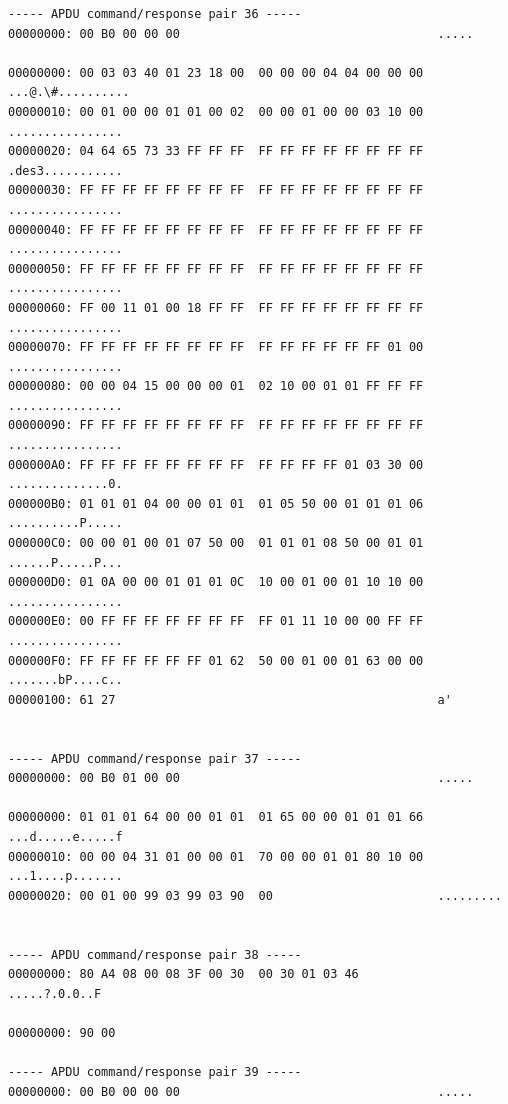 \documentclass[bsc,frontabs,twoside,singlespacing,parskip,deptreport]{infthesis}     %
\begin{document}
\begin{appendices}
\begin{Verbatim}[commandchars=\\\{\}, fontsize=\small]
----- APDU command/response pair 36 -----
00000000: 00 B0 00 00 00                                    .....

00000000: 00 03 03 40 01 23 18 00  00 00 00 04 04 00 00 00  ...@.\#..........
00000010: 00 01 00 00 01 01 00 02  00 00 01 00 00 03 10 00  ................
00000020: 04 64 65 73 33 FF FF FF  FF FF FF FF FF FF FF FF  .des3...........
00000030: FF FF FF FF FF FF FF FF  FF FF FF FF FF FF FF FF  ................
00000040: FF FF FF FF FF FF FF FF  FF FF FF FF FF FF FF FF  ................
00000050: FF FF FF FF FF FF FF FF  FF FF FF FF FF FF FF FF  ................
00000060: FF 00 11 01 00 18 FF FF  FF FF FF FF FF FF FF FF  ................
00000070: FF FF FF FF FF FF FF FF  FF FF FF FF FF FF 01 00  ................
00000080: 00 00 04 15 00 00 00 01  02 10 00 01 01 FF FF FF  ................
00000090: FF FF FF FF FF FF FF FF  FF FF FF FF FF FF FF FF  ................
000000A0: FF FF FF FF FF FF FF FF  FF FF FF FF 01 03 30 00  ..............0.
000000B0: 01 01 01 04 00 00 01 01  01 05 50 00 01 01 01 06  ..........P.....
000000C0: 00 00 01 00 01 07 50 00  01 01 01 08 50 00 01 01  ......P.....P...
000000D0: 01 0A 00 00 01 01 01 0C  10 00 01 00 01 10 10 00  ................
000000E0: 00 FF FF FF FF FF FF FF  FF 01 11 10 00 00 FF FF  ................
000000F0: FF FF FF FF FF FF 01 62  50 00 01 00 01 63 00 00  .......bP....c..
00000100: 61 27                                             a'


----- APDU command/response pair 37 -----
00000000: 00 B0 01 00 00                                    .....

00000000: 01 01 01 64 00 00 01 01  01 65 00 00 01 01 01 66  ...d.....e.....f
00000010: 00 00 04 31 01 00 00 01  70 00 00 01 01 80 10 00  ...1....p.......
00000020: 00 01 00 99 03 99 03 90  00                       .........


----- APDU command/response pair 38 -----
00000000: 80 A4 08 00 08 3F 00 30  00 30 01 03 46           .....?.0.0..F

00000000: 90 00      

----- APDU command/response pair 39 -----
00000000: 00 B0 00 00 00                                    .....


\end{Verbatim}
\end{appendices}
\end{document}
